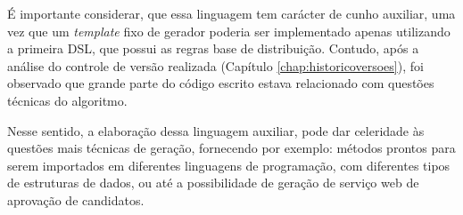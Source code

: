    
 
 É importante considerar, que essa linguagem tem carácter de cunho auxiliar, uma vez que um \textit{template} fixo de gerador poderia ser implementado apenas utilizando a primeira \gls{DSL}, que possui as regras base de distribuição. Contudo, após a análise do controle de versão realizada (Capítulo \ref{chap:historicoversoes}), foi observado que grande parte do código escrito estava relacionado com questões técnicas do algoritmo.
 
 Nesse sentido, a elaboração dessa linguagem auxiliar, pode dar celeridade às questões mais técnicas de geração, fornecendo por exemplo: métodos prontos para serem importados em diferentes linguagens de programação, com diferentes tipos de estruturas de dados, ou até a possibilidade de geração de serviço web de aprovação de candidatos.
